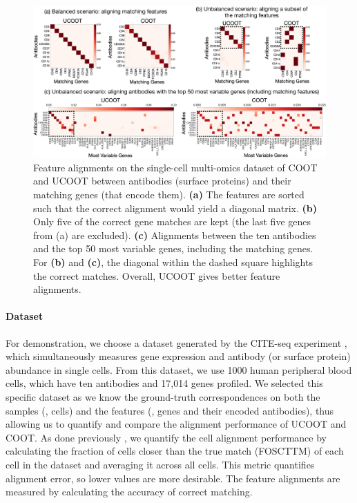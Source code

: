 \begin{figure}[t]
    \centering
    \includegraphics[trim={0.2cm 0.2cm 0.8cm 0.5cm}, clip, width=\linewidth, keepaspectratio=true]{./Chapitre3/fig/genes-alignments.pdf}
    \caption[Feature alignments on the single-cell multi-omics dataset of COOT and UCOOT between antibodies and their matching genes]{Feature alignments on the single-cell multi-omics dataset of COOT and UCOOT between antibodies (surface proteins) and their matching genes (that encode them). \textbf{(a)} The features are sorted such that the correct alignment would yield a diagonal matrix. \textbf{(b)} Only five of the correct gene matches are kept (the last five genes from (a) are excluded). \textbf{(c)} Alignments between the ten antibodies and the top 50 most variable genes, including the matching genes.
    For \textbf{(b)} and \textbf{(c)}, the diagonal within the dashed square highlights the correct matches.
    Overall, UCOOT gives better feature alignments.
    \label{fig:multiomics}}
\end{figure}

\paragraph{Dataset} For demonstration, we choose a dataset generated by
the CITE-seq experiment \citep{CITEseq},
which simultaneously measures gene expression and antibody (or surface protein)
abundance in single cells. From this dataset, we use 1000 human peripheral blood cells,
which have ten antibodies and 17,014 genes profiled. We selected this specific dataset
as we know the ground-truth correspondences on both the samples (\ie, cells)
and the features (\ie, genes and their encoded antibodies), thus allowing us to quantify
and compare the alignment performance of UCOOT and COOT.
As done previously \citep{Pamona, Demetci22, Liu2019}, we quantify the cell alignment performance
by calculating the fraction of cells closer than the true match (FOSCTTM) of each cell
in the dataset and averaging it across all cells. This metric quantifies alignment error,
so lower values are more desirable. The feature alignments are measured by calculating
the accuracy of correct matching.

